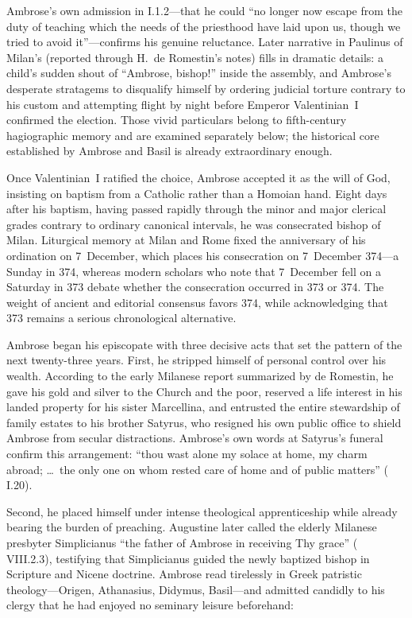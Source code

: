 Ambrose's own admission in  I.1.2---that he could ``no longer now escape from the duty of teaching which the needs of the priesthood have laid upon us, though we tried to avoid it''---confirms his genuine reluctance. Later narrative in Paulinus of Milan's  (reported through H.~de Romestin's notes) fills in dramatic details: a child's sudden shout of ``Ambrose, bishop!'' inside the assembly, and Ambrose's desperate stratagems to disqualify himself by ordering judicial torture contrary to his custom and attempting flight by night before Emperor Valentinian~I confirmed the election. Those vivid particulars belong to fifth-century hagiographic memory and are examined separately below; the historical core established by Ambrose and Basil is already extraordinary enough.

Once Valentinian~I ratified the choice, Ambrose accepted it as the will of God, insisting on baptism from a Catholic rather than a Homoian hand. Eight days after his baptism, having passed rapidly through the minor and major clerical grades contrary to ordinary canonical intervals, he was consecrated bishop of Milan. Liturgical memory at Milan and Rome fixed the anniversary of his ordination on 7~December, which places his consecration on 7~December 374---a Sunday in 374, whereas modern scholars who note that 7~December fell on a Saturday in 373 debate whether the consecration occurred in 373 or 374. The weight of ancient and editorial consensus favors 374, while acknowledging that 373 remains a serious chronological alternative.

Ambrose began his episcopate with three decisive acts that set the pattern of the next twenty-three years. First, he stripped himself of personal control over his wealth. According to the early Milanese report summarized by de Romestin, he gave his gold and silver to the Church and the poor, reserved a life interest in his landed property for his sister Marcellina, and entrusted the entire stewardship of family estates to his brother Satyrus, who resigned his own public office to shield Ambrose from secular distractions. Ambrose's own words at Satyrus's funeral confirm this arrangement: ``thou wast alone my solace at home, my charm abroad; \ldots\ the only one on whom rested care of home and of public matters'' ( I.20).

Second, he placed himself under intense theological apprenticeship while already bearing the burden of preaching. Augustine later called the elderly Milanese presbyter Simplicianus ``the father of Ambrose in receiving Thy grace'' ( VIII.2.3), testifying that Simplicianus guided the newly baptized bishop in Scripture and Nicene doctrine. Ambrose read tirelessly in Greek patristic theology---Origen, Athanasius, Didymus, Basil---and admitted candidly to his clergy that he had enjoyed no seminary leisure beforehand:

